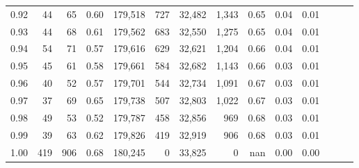 \begin{tabular}{rrrrrrrrrrrrrr}
0.92 &     44 &   65 &  0.60 &  179,518 &      727 &  32,482 &   1,343 &  0.65 &  0.04 &      0.01 \\
0.93 &     44 &   68 &  0.61 &  179,562 &      683 &  32,550 &   1,275 &  0.65 &  0.04 &      0.01 \\
0.94 &     54 &   71 &  0.57 &  179,616 &      629 &  32,621 &   1,204 &  0.66 &  0.04 &      0.01 \\
0.95 &     45 &   61 &  0.58 &  179,661 &      584 &  32,682 &   1,143 &  0.66 &  0.03 &      0.01 \\
0.96 &     40 &   52 &  0.57 &  179,701 &      544 &  32,734 &   1,091 &  0.67 &  0.03 &      0.01 \\
0.97 &     37 &   69 &  0.65 &  179,738 &      507 &  32,803 &   1,022 &  0.67 &  0.03 &      0.01 \\
0.98 &     49 &   53 &  0.52 &  179,787 &      458 &  32,856 &     969 &  0.68 &  0.03 &      0.01 \\
0.99 &     39 &   63 &  0.62 &  179,826 &      419 &  32,919 &     906 &  0.68 &  0.03 &      0.01 \\
1.00 &    419 &  906 &  0.68 &  180,245 &        0 &  33,825 &       0 &   nan &  0.00 &      0.00 \\
\bottomrule
\end{tabular}
